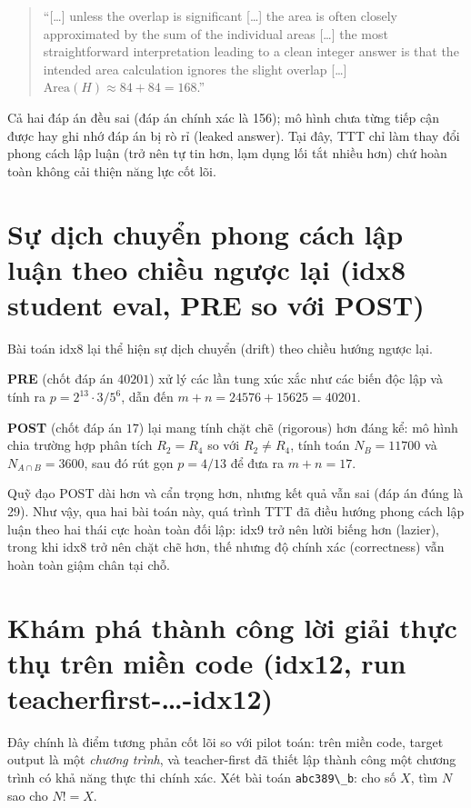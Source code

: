 \begin{quote}
``{[\ldots]} unless the overlap is significant {[\ldots]} the area is often closely approximated by the sum of the individual areas {[\ldots]} the most straightforward interpretation leading to a clean integer answer is that the intended area calculation ignores the slight overlap {[\ldots]} \(\text{Area}(H) \approx 84 + 84 = 168\).''
\end{quote}

Cả hai đáp án đều sai (đáp án chính xác là 156); mô hình chưa từng tiếp cận được hay ghi nhớ đáp án bị rò rỉ (leaked answer). Tại đây, TTT chỉ làm thay đổi phong cách lập luận (trở nên tự tin hơn, lạm dụng lối tắt nhiều hơn) chứ hoàn toàn không cải thiện năng lực cốt lõi.

\section{Sự dịch chuyển phong cách lập luận theo chiều ngược lại (idx8 student eval, PRE so với POST)}\label{d.4-the-opposite-stylistic-drift-idx8-student-eval-pre-vs-post}

Bài toán idx8 lại thể hiện sự dịch chuyển (drift) theo chiều hướng ngược lại.

\textbf{PRE} (chốt đáp án \(\boxed{40201}\)) xử lý các lần tung xúc xắc như các biến độc lập và tính ra \(p = 2^{13}\cdot 3 / 5^6\), dẫn đến \(m+n = 24576 + 15625 = 40201\).

\textbf{POST} (chốt đáp án \(\boxed{17}\)) lại mang tính chặt chẽ (rigorous) hơn đáng kể: mô hình chia trường hợp phân tích \(R_2 = R_4\) so với \(R_2 \neq R_4\), tính toán \(N_B = 11700\) và \(N_{A\cap B} = 3600\), sau đó rút gọn \(p = 4/13\) để đưa ra \(m+n = 17\).

Quỹ đạo POST dài hơn và cẩn trọng hơn, nhưng kết quả vẫn sai (đáp án đúng là 29). Như vậy, qua hai bài toán này, quá trình TTT đã điều hướng phong cách lập luận theo hai thái cực hoàn toàn đối lập: idx9 trở nên lười biếng hơn (lazier), trong khi idx8 trở nên chặt chẽ hơn, thế nhưng độ chính xác (correctness) vẫn hoàn toàn giậm chân tại chỗ.

\section{Khám phá thành công lời giải thực thụ trên miền code (idx12, run teacherfirst-\dots-idx12)}\label{d.5-genuine-discovery-on-code-idx12-run-teacherfirst-...-idx12}

Đây chính là điểm tương phản cốt lõi so với pilot toán: trên miền code, target output là một \emph{chương trình}, và teacher-first đã thiết lập thành công một chương trình có khả năng thực thi chính xác. Xét bài toán \passthrough{\lstinline!abc389\_b!}: cho số \(X\), tìm \(N\) sao cho \(N! = X\).


